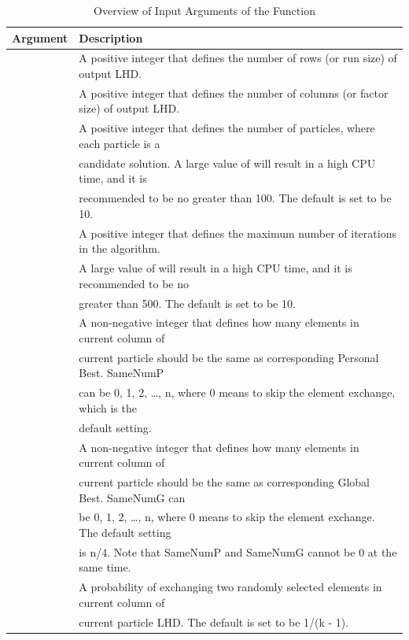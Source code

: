 \begin{table}[!htb]
	\caption{Overview of Input Arguments of the  Function}\label{T2}
	\begin{center}
		\begin{tabular}{ll}
				\hline
				Argument & Description\\
				\hline
				\RR{n} & A positive integer that defines the number of rows (or run size) of output LHD.\\
				\RR{k} & A positive integer that defines the number of columns (or factor size) of output LHD.\\
				\RR{m} & A positive integer that defines the number of particles, where each particle is a\\
				& candidate solution. A large value of \RR{N} will result in a high CPU time, and it is \\
				& recommended to be no greater than 100. The default is set to be 10.\\
				\RR{N} & A positive integer that defines the maximum number of iterations in the algorithm. \\
				& A large value of \RR{N} will result in a high CPU time, and it is recommended to be no \\
				& greater than 500. The default is set to be 10.\\
				\hline
				\RR{SameNumP} & A non-negative integer that defines how many elements in current column of \\
				& current particle should be the same as corresponding Personal Best. SameNumP \\
				& can be 0, 1, 2, \ldots , n, where 0 means to skip the element exchange, which is the \\
				& default setting.\\
				\RR{SameNumG} & A non-negative integer that defines how many elements in current column of \\
				& current particle should be the same as corresponding Global Best. SameNumG can \\
				& be 0, 1, 2, \ldots , n, where 0 means to skip the element exchange. The default setting\\
				& is n/4. Note that SameNumP and SameNumG cannot be 0 at the same time.\\
				\RR{p0} & A probability of exchanging two randomly selected elements in current column of \\
				& current particle LHD. The default is set to be 1/(k - 1). \\

\end{tabular}
\end{center}
\end{table}
